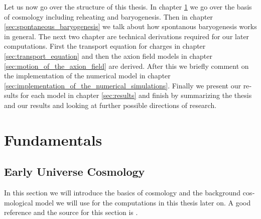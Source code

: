 \documentclass[master,       %
               twoside,        %
               BCOR10mm,       %
               english,ngerman, %
               ]{GAUBM}
\begin{document}
\begin{otherlanguage}{english}
Let us now go over the structure of this thesis.
In chapter \ref{sec:fundermentals} we go over the basis of cosmology including reheating and baryogenesis.
Then in chapter \ref{sec:spontaneous_baryogenesis} we talk about how spontanous baryogenesis works in general.
The next two chapter are technical derivations required for our later computations. First the transport equation for charges in chapter \ref{sec:transport_equation} and then the axion field models in chapter \ref{sec:motion_of_the_axion_field} are derived.
After this we briefly comment on the implementation of the numerical model in chapter \ref{sec:implementation_of_the_numerical_simulations}.
Finally we present our results for each model in chapter \ref{sec:results}
and finish by summarizing the thesis and our results and looking at further possible directions of research.

\chapter{Fundamentals}
\label{sec:fundermentals}

\section{Early Universe Cosmology}
In this section we will introduce the basics of cosmology and the background cosmological model we will use for the computations in this thesis later on.
A good reference and the source for this section is \cite{the_early_universe_kolb_and_turner}.


\end{otherlanguage}
\end{document}
